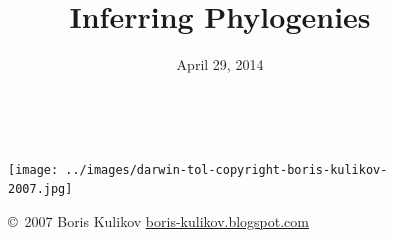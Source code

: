 


% 



\title[Inferring Phylogenies]{Inferring Phylogenies}
\date{April 29, 2014}



\begin{noheadline}
\begin{frame}
    \begin{columns}[c]
            \maketitle
            \begin{figure}
                \begin{center}
                \texttt{[image: ../images/darwin-tol-copyright-boris-kulikov-2007.jpg]}
                \caption{\tiny \copyright~2007 Boris Kulikov \href{http://boris-kulikov.blogspot.com/}{boris-kulikov.blogspot.com}}
                \end{center}
            \end{figure}
    \end{columns}
\end{frame}
\end{noheadline}


